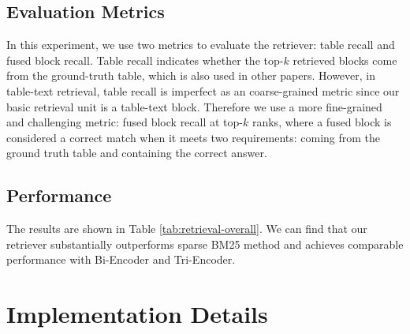 \documentclass[11pt]{article}
\begin{document}
\subsection{Evaluation Metrics}
In this experiment, we use two metrics to evaluate the retriever: table recall and fused block recall. 
Table recall indicates whether the top-$k$ retrieved blocks come from the ground-truth table, which is also used in other papers.
However, in table-text retrieval, table recall is imperfect as an coarse-grained metric since our basic retrieval unit is a table-text block.
Therefore we use a more fine-grained and challenging  metric:  fused  block  recall  at top-$k$ ranks, where a fused block is considered a correct match when it meets two requirements: coming from the ground truth table and containing the correct answer. 

\subsection{Performance}
The results are shown in Table \ref{tab:retrieval-overall}. We can find that our retriever substantially outperforms sparse BM25 method and achieves comparable performance with Bi-Encoder and Tri-Encoder.




\begin{table}[htbp]
\small
  \centering
  \caption{Overall retrieval results on OTT-QA dev set. Table recalls and fused block recalls are reported.}
  \label{tab:retrieval-overall}
\end{table}





\section{Implementation Details}
\label{appendix:detail}
\end{document}
